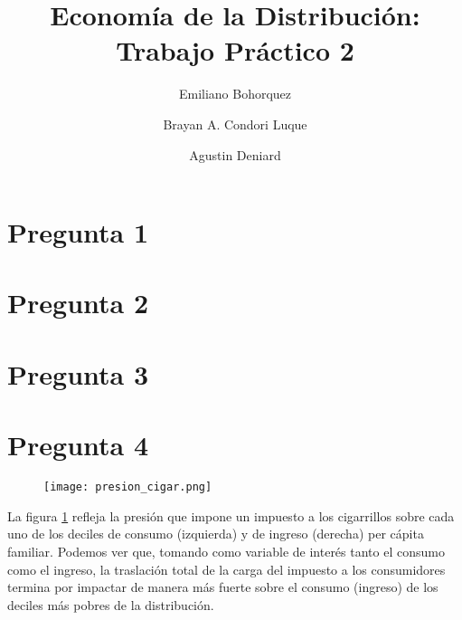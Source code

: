 \documentclass[11pt,oneside]{article}
\begin{document}
	
	
	\title{Economía de la Distribución: Trabajo Práctico 2}
	\author{
		Emiliano Bohorquez \and 
		Brayan A. Condori Luque \and 
		Agustin Deniard}
	
	\maketitle
	
	\section*{Pregunta 1}
	
	
	\section*{Pregunta 2}
	
	
	\section*{Pregunta 3}
	
	\section*{Pregunta 4}

	\begin{figure}
    		\centering
    		\texttt{[image: presion\_cigar.png]}
    		\label{fig:4A}
	\end{figure}

	La figura \ref{fig:4A} refleja la presión que impone un impuesto a los cigarrillos sobre cada uno de los deciles de consumo (izquierda) y de ingreso (derecha) per cápita familiar. Podemos ver que, tomando como variable de interés tanto el consumo como el ingreso, la traslación total de la carga del impuesto a los consumidores termina por impactar de manera más fuerte sobre el consumo (ingreso) de los deciles más pobres de la distribución. 
\end{document}
